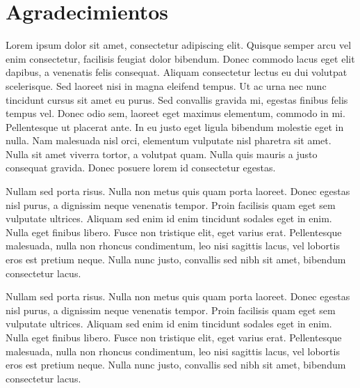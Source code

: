 \thispagestyle{empty}
\null{}
\section*{Agradecimientos}
Lorem ipsum dolor sit amet, consectetur adipiscing elit. Quisque semper arcu vel enim consectetur, facilisis feugiat dolor bibendum. Donec commodo lacus eget elit dapibus, a venenatis felis consequat. Aliquam consectetur lectus eu dui volutpat scelerisque. Sed laoreet nisi in magna eleifend tempus. Ut ac urna nec nunc tincidunt cursus sit amet eu purus. Sed convallis gravida mi, egestas finibus felis tempus vel. Donec odio sem, laoreet eget maximus elementum, commodo in mi. Pellentesque ut placerat ante. In eu justo eget ligula bibendum molestie eget in nulla. Nam malesuada nisl orci, elementum vulputate nisl pharetra sit amet. Nulla sit amet viverra tortor, a volutpat quam. Nulla quis mauris a justo consequat gravida. Donec posuere lorem id consectetur egestas.

Nullam sed porta risus. Nulla non metus quis quam porta laoreet. Donec egestas nisl purus, a dignissim neque venenatis tempor. Proin facilisis quam eget sem vulputate ultrices. Aliquam sed enim id enim tincidunt sodales eget in enim. Nulla eget finibus libero. Fusce non tristique elit, eget varius erat. Pellentesque malesuada, nulla non rhoncus condimentum, leo nisi sagittis lacus, vel lobortis eros est pretium neque. Nulla nunc justo, convallis sed nibh sit amet, bibendum consectetur lacus.

Nullam sed porta risus. Nulla non metus quis quam porta laoreet. Donec egestas nisl purus, a dignissim neque venenatis tempor. Proin facilisis quam eget sem vulputate ultrices. Aliquam sed enim id enim tincidunt sodales eget in enim. Nulla eget finibus libero. Fusce non tristique elit, eget varius erat. Pellentesque malesuada, nulla non rhoncus condimentum, leo nisi sagittis lacus, vel lobortis eros est pretium neque. Nulla nunc justo, convallis sed nibh sit amet, bibendum consectetur lacus.

